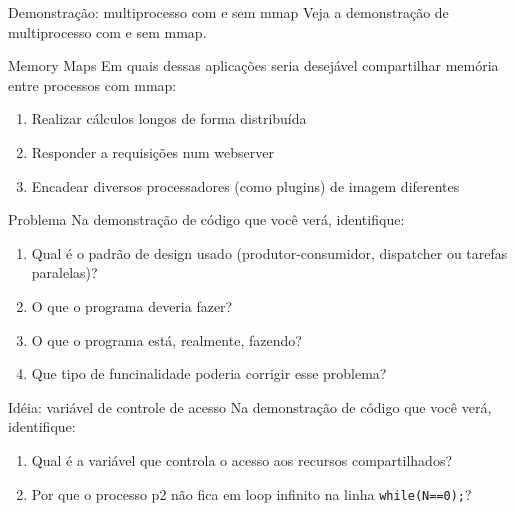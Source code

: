 \documentclass{beamer}
\begin{document}
\begin{frame}[fragile]{Demonstração: multiprocesso com e sem mmap}
  \centering
  \Large
  Veja a demonstração de multiprocesso com e sem mmap.
\end{frame}

\begin{frame}[fragile]{Memory Maps}
  \centering
  \Large
  Em quais dessas aplicações seria desejável compartilhar memória entre
  processos com mmap:
  \begin{enumerate}
    \item Realizar cálculos longos de forma distribuída
    \item Responder a requisições num webserver
    \item Encadear diversos processadores (como plugins) de imagem diferentes
  \end{enumerate}
\end{frame}

\begin{frame}[fragile]{Problema}
  \centering
  \large
  Na demonstração de código que você verá, identifique:
  \begin{enumerate}
  \item Qual é o padrão de design usado (produtor-consumidor, dispatcher ou
    tarefas paralelas)?
  \item O que o programa deveria fazer?
  \item O que o programa está, realmente, fazendo?
  \item Que tipo de funcinalidade poderia corrigir esse problema?
  \end{enumerate}
\end{frame}

\begin{frame}[fragile]{Idéia: variável de controle de acesso}
  \centering
  \large
  Na demonstração de código que você verá, identifique:
  \begin{enumerate}
  \item Qual é a variável que controla o acesso aos recursos compartilhados?
  \item Por que o processo p2 não fica em loop infinito na linha
    \texttt{while(N==0);}?
  \end{enumerate}
\end{frame}
\end{document}
